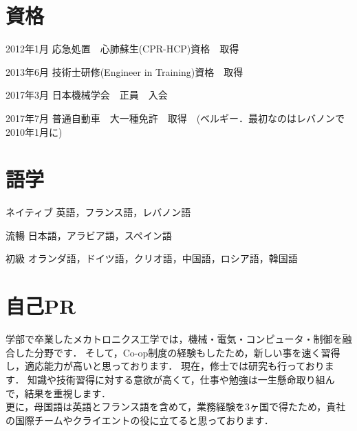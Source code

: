 \documentclass[10pt, a4paper]{article}
\begin{document}
\section{資格}
\begin{lonelist}
\item[2012年1月] 応急処置　心肺蘇生(CPR-HCP)資格　取得
\item[2013年6月] 技術士研修(Engineer in Training)資格　取得
\item[2017年3月] 日本機械学会　正員　入会
\item[2017年7月] 普通自動車　大一種免許　取得　(ベルギー．最初なのはレバノンで2010年1月に)
\end{lonelist}

\section{語学}
\begin{lonelist}
\item[ネイティブ] 英語，フランス語，レバノン語
\item[流暢] 日本語，アラビア語，スペイン語
\item[初級] オランダ語，ドイツ語，クリオ語，中国語，ロシア語，韓国語
\end{lonelist}

\section{自己PR}
学部で卒業したメカトロニクス工学では，機械・電気・コンピュータ・制御を融合した分野です．
そして，Co-op制度の経験もしたため，新しい事を速く習得し，適応能力が高いと思っております．
現在，修士では研究も行っております．
知識や技術習得に対する意欲が高くて，仕事や勉強は一生懸命取り組んで，結果を重視します． 
\\

更に，母国語は英語とフランス語を含めて，業務経験を3ヶ国で得たため，貴社の国際チームやクライエントの役に立てると思っております．
\end{document}
